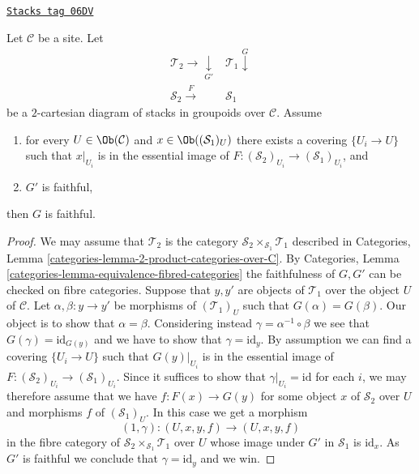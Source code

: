 \begin{lemma}
\label{stacks-lemma-faithful-descent}
\href{https://stacks.math.columbia.edu/tag/06DV}{\texttt{Stacks tag 06DV}}

Let $\mathcal{C}$ be a site. Let
$$
\begin{array}{cc}\mathcal{T}_2 \longrightarrow\underset{G'}{\downarrow} & \mathcal{T}_1 \overset{G}{\downarrow} \\ \mathcal{S}_2 \overset{F}{\longrightarrow} & \mathcal{S}_1\end{array}
$$
be a $2$-cartesian diagram of stacks in groupoids over $\mathcal{C}$.
Assume
\begin{enumerate}
\item for every $U \in \Ob(\mathcal{C})$ and
$x \in \Ob((\mathcal{S}_1)_U)$ there exists a covering
$\{U_i \to U\}$ such that $x|_{U_i}$ is in the essential
image of $F : (\mathcal{S}_2)_{U_i} \to (\mathcal{S}_1)_{U_i}$, and
\item $G'$ is faithful,
\end{enumerate}
then $G$ is faithful.
\end{lemma}

\begin{proof}
We may assume that $\mathcal{T}_2$ is the category
$\mathcal{S}_2 \times_{\mathcal{S}_1} \mathcal{T}_1$
described in
Categories, Lemma \ref{categories-lemma-2-product-categories-over-C}.
By
Categories, Lemma \ref{categories-lemma-equivalence-fibred-categories}
the faithfulness of $G, G'$ can be checked on fibre categories.
Suppose that $y, y'$ are objects of $\mathcal{T}_1$ over the object $U$
of $\mathcal{C}$. Let $\alpha, \beta : y \to y'$ be morphisms of
$(\mathcal{T}_1)_U$ such that $G(\alpha) = G(\beta)$. Our object is to
show that $\alpha = \beta$. Considering instead
$\gamma = \alpha^{-1} \circ \beta$ we see that $G(\gamma) = \text{id}_{G(y)}$
and we have to show that $\gamma = \text{id}_y$. By assumption we
can find a covering $\{U_i \to U\}$ such that $G(y)|_{U_i}$ is in the
essential image of $F :(\mathcal{S}_2)_{U_i} \to (\mathcal{S}_1)_{U_i}$.
Since it suffices to show that $\gamma|_{U_i} = \text{id}$ for each $i$,
we may therefore assume that we have
$f : F(x) \to G(y)$ for some object $x$ of $\mathcal{S}_2$ over $U$
and morphisms $f$ of $(\mathcal{S}_1)_U$. In this case we get
a morphism
$$
(1, \gamma) : (U, x, y, f) \longrightarrow (U, x, y, f)
$$
in the fibre category of $\mathcal{S}_2 \times_{\mathcal{S}_1} \mathcal{T}_1$
over $U$ whose image under $G'$ in $\mathcal{S}_1$ is $\text{id}_x$.
As $G'$ is faithful we conclude that $\gamma = \text{id}_y$ and we win.
\end{proof}


